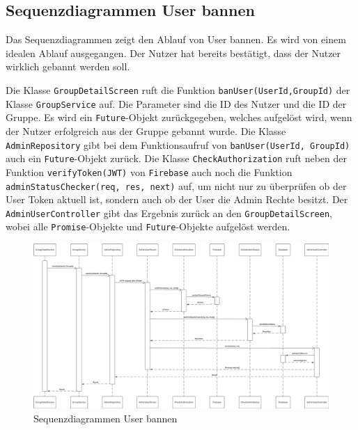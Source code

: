 \documentclass{entwurfsheft}
\begin{document}
\begin{sloppypar}
    \newpage
    
    \subsection{Sequenzdiagrammen User bannen}
        Das Sequenzdiagrammen zeigt den Ablauf von User bannen. Es wird von einem idealen Ablauf ausgegangen. Der Nutzer hat bereits bestätigt, dass der Nutzer wirklich gebannt werden soll.

        Die Klasse \texttt{GroupDetailScreen} ruft die Funktion \texttt{banUser(UserId,GroupId)} der Klasse \texttt{Group\-Service} auf. Die Parameter sind die ID des Nutzer und die ID der Gruppe. Es wird ein \texttt{Future}-Objekt zurückgegeben, welches aufgelöst wird, wenn der Nutzer erfolgreich aus der Gruppe gebannt wurde. Die Klasse \texttt{AdminRepository} gibt bei dem Funktionsaufruf von \texttt{banUser(UserId, GroupId)} auch ein \texttt{Future}-Objekt zurück. Die Klasse \texttt{CheckAuthorization} ruft neben der Funktion \texttt{verifyToken(JWT)} von \texttt{Firebase} auch noch die Funktion \texttt{adminStatusChecker(req, res, next)} auf, um nicht nur zu überprüfen ob der User Token aktuell ist, sondern auch ob der User die Admin Rechte besitzt. Der \texttt{AdminUserController} gibt das Ergebnis zurück an den \texttt{GroupDetailScreen}, wobei alle \texttt{Promise}-Objekte und \texttt{Future}-Objekte aufgelöst werden.

        \begin{figure}[htp]
            \centering
            \includegraphics[width = \linewidth]{images/processDescription/SequenzdiagrammBanUser.pdf}
            \caption{Sequenzdiagrammen User bannen}
        \end{figure}

    \newpage 

\newpage

\end{sloppypar}
\end{document}
